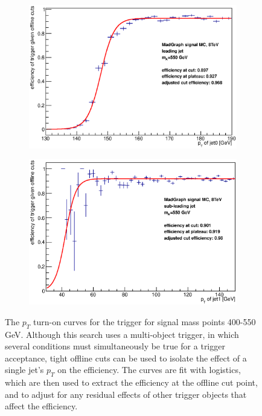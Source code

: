 \begin{figure}[phtb!]
\begin{center}
  \begin{subfigure}[leading jet, $m_{A}=550$ GeV]{0.4\textwidth}\includegraphics[width=\textwidth]{Systematics/images/jet0_trigger_turn_on_bAbb_550_j35.eps}\end{subfigure}
  \begin{subfigure}[sub-leading jet, $m_{A}=550$ GeV]{0.4\textwidth}\includegraphics[width=\textwidth]{Systematics/images/jet1_trigger_turn_on_bAbb_550_j35.eps}\end{subfigure}
  \caption{The $p_T$ turn-on curves for the trigger for signal mass points 400-550 GeV.
  Although this search uses a multi-object trigger, in which several conditions 
  must simultaneously be true for a trigger acceptance, tight offline cuts can be used to isolate the effect 
  of a single jet's $p_T$ on the efficiency.  The curves are fit 
  with logistics, which are then used to extract the efficiency at the offline cut point, and to 
  adjust for any residual effects of other trigger objects that affect the efficiency. \label{fig:trigger_turn_on_1}}
    \end{center}
\end{figure}



